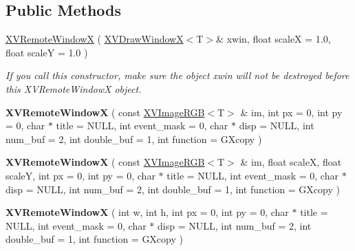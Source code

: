 \subsection*{Public Methods}
\begin{CompactItemize}
\item 
\label{XVRemoteWindowX_a0}
\hypertarget{class_XVRemoteWindowX_a0}{
\hyperlink{class_XVRemoteWindowX_a0}{XVRemote\-Window\-X} ( \hyperlink{class_XVDrawWindowX}{XVDraw\-Window\-X}$<$T$>$\& xwin, float scale\-X = 1.0, float scale\-Y = 1.0 )}

\begin{CompactList}\small\item\em If you call this constructor, make sure the object xwin will not be destroyed before this XVRemote\-Window\-X object.\item\end{CompactList}\item 
\label{XVRemoteWindowX_a1}
\hypertarget{class_XVRemoteWindowX_a1}{
{\bf XVRemote\-Window\-X} ( const \hyperlink{class_XVImageRGB}{XVImage\-RGB}$<$T$>$ \& im, int px = 0, int py = 0, char $\ast$ title = NULL, int event\_\-mask = 0, char $\ast$ disp = NULL, int num\_\-buf = 2, int double\_\-buf = 1, int function = GXcopy )}

\item 
\label{XVRemoteWindowX_a2}
\hypertarget{class_XVRemoteWindowX_a2}{
{\bf XVRemote\-Window\-X} ( const \hyperlink{class_XVImageRGB}{XVImage\-RGB}$<$T$>$ \& im, float scale\-X, float scale\-Y, int px = 0, int py = 0, char $\ast$ title = NULL, int event\_\-mask = 0, char $\ast$ disp = NULL, int num\_\-buf = 2, int double\_\-buf = 1, int function = GXcopy )}

\item 
\label{XVRemoteWindowX_a3}
\hypertarget{class_XVRemoteWindowX_a3}{
{\bf XVRemote\-Window\-X} ( int w, int h, int px = 0, int py = 0, char $\ast$ title = NULL, int event\_\-mask = 0, char $\ast$ disp = NULL, int num\_\-buf = 2, int double\_\-buf = 1, int function = GXcopy )}


\end{CompactItemize}
